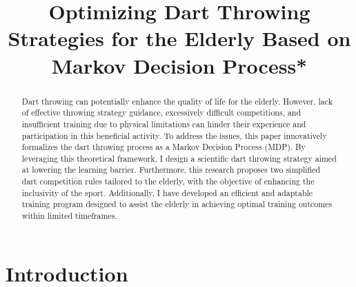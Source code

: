 \documentclass[cjjs]{ipart}
\theoremstyle{plain}
\begin{document}
\begin{frontmatter}

\title{Optimizing Dart Throwing Strategies for the Elderly
 Based on Markov Decision Process*}



\begin{aug}
    \author{ }
    \address{Beijing No.101 High School,\\
             China\\
             }
    
\end{aug}


\begin{abstract}
\noindent
Dart throwing can potentially enhance the quality of life for the elderly. However, lack of effective throwing strategy guidance, excessively difficult competitions, and insufficient training due to physical limitations can hinder their experience and participation in this beneficial activity. To address the issues, this paper innovatively formalizes the dart throwing process as a Markov Decision Process (MDP). By leveraging this theoretical framework, I design a scientific dart throwing strategy aimed at lowering the learning barrier. Furthermore, this research proposes two simplified dart competition rules tailored to the elderly, with the objective of enhancing the inclusivity of the sport. Additionally, I have developed an efficient and adaptable training program designed to assist the elderly in achieving optimal training outcomes within limited timeframes.
\end{abstract}

\begin{keyword}
\end{keyword}

\end{frontmatter}
    
\section{Introduction}
\end{document}
